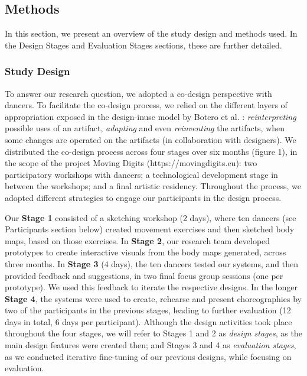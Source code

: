 \subsection{Methods}

In this section, we present an overview of the study design and methods used. In the Design Stages and Evaluation Stages sections, these are further detailed.

\subsubsection{Study Design}

To answer our research question, we adopted a co-design perspective with dancers. To facilitate the co-design process, we relied on the different layers of appropriation exposed in the design-inuse model by Botero et al. \cite{botero_expanding_2010}: \textit{reinterpreting} possible uses of an artifact, \textit{adapting} and even \textit{reinventing} the artifacts, when some changes are operated on the artifacts (in collaboration with designers). We distributed the co-design process across four stages over six months (figure 1), in the scope of the project Moving Digits (https://movingdigits.eu): two participatory workshops with dancers; a technological development stage in between the workshops; and a final artistic residency. Throughout the process, we adopted different strategies to engage our participants in the design process.

Our \textbf{Stage 1} consisted of a sketching workshop (2 days), where ten dancers (see Participants section below) created movement exercises and then sketched body maps, based on those exercises. In \textbf{Stage 2}, our research team developed prototypes to create interactive visuals from the body maps generated, across three months. In \textbf{Stage 3} (4 days), the ten dancers tested our systems, and then provided feedback and suggestions, in two final focus group sessions (one per prototype). We used this feedback to iterate the respective designs. In the longer \textbf{Stage 4}, the systems were used to create, rehearse and present choreographies by two of the participants in the previous stages, leading to further evaluation (12 days in total, 6 days per participant). Although the design activities took place throughout the four stages, we will refer to Stages 1 and 2 as \textit{design stages}, as the main design features were created then; and Stages 3 and 4 as \textit{evaluation stages}, as we conducted iterative fine-tuning of our previous designs, while focusing on evaluation.


